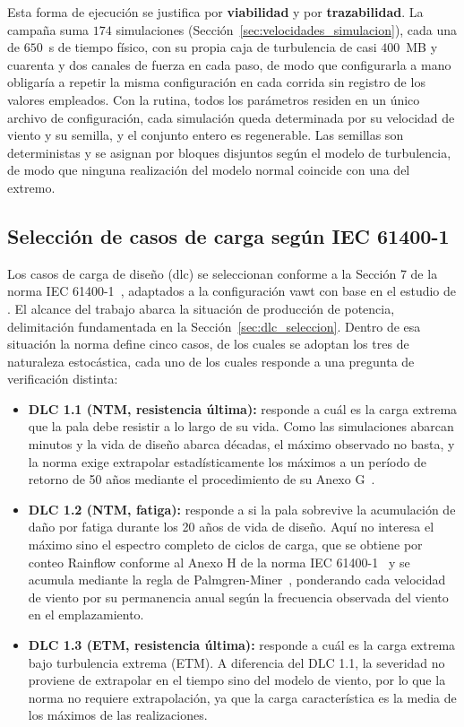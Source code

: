 Esta forma de ejecución se justifica por \textbf{viabilidad} y por \textbf{trazabilidad}. La campaña suma $174$ simulaciones (Sección~\ref{sec:velocidades_simulacion}), cada una de $650$~s de tiempo físico, con su propia caja de turbulencia de casi $400$~MB y cuarenta y dos canales de fuerza en cada paso, de modo que configurarla a mano obligaría a repetir la misma configuración en cada corrida sin registro de los valores empleados. Con la rutina, todos los parámetros residen en un único archivo de configuración, cada simulación queda determinada por su velocidad de viento y su semilla, y el conjunto entero es regenerable. Las semillas son deterministas y se asignan por bloques disjuntos según el modelo de turbulencia, de modo que ninguna realización del modelo normal coincide con una del extremo.

\subsection{Selección de casos de carga según IEC 61400-1}
\label{sec:seleccion_dlc}

Los casos de carga de diseño (\acrshort{dlc}) se seleccionan conforme a la Sección 7 de la norma IEC 61400-1~\parencite*{IEC61400-1}, adaptados a la configuración \gls{vawt} con base en el estudio de \textcite{Galinos2015}. El alcance del trabajo abarca la situación de producción de potencia, delimitación fundamentada en la Sección~\ref{sec:dlc_seleccion}. Dentro de esa situación la norma define cinco casos, de los cuales se adoptan los tres de naturaleza estocástica, cada uno de los cuales responde a una pregunta de verificación distinta:

\begin{itemize}
    \item \textbf{DLC 1.1 (NTM, resistencia última):} responde a cuál es la carga extrema que la pala debe resistir a lo largo de su vida. Como las simulaciones abarcan minutos y la vida de diseño abarca décadas, el máximo observado no basta, y la norma exige extrapolar estadísticamente los máximos a un período de retorno de 50 años mediante el procedimiento de su Anexo G~\parencite{IEC61400-1}.
    \item \textbf{DLC 1.2 (NTM, fatiga):} responde a si la pala sobrevive la acumulación de daño por fatiga durante los 20 años de vida de diseño. Aquí no interesa el máximo sino el espectro completo de ciclos de carga, que se obtiene por conteo Rainflow conforme al Anexo H de la norma IEC 61400-1~\parencite*{IEC61400-1} y se acumula mediante la regla de Palmgren-Miner~\parencite{Palmgren1924,Miner1945}, ponderando cada velocidad de viento por su permanencia anual según la frecuencia observada del viento en el emplazamiento.
    \item \textbf{DLC 1.3 (ETM, resistencia última):} responde a cuál es la carga extrema bajo turbulencia extrema (ETM). A diferencia del DLC 1.1, la severidad no proviene de extrapolar en el tiempo sino del modelo de viento, por lo que la norma no requiere extrapolación, ya que la carga característica es la media de los máximos de las realizaciones.
\end{itemize}

